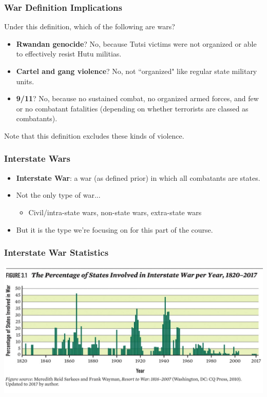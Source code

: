 \documentclass{beamer}
\begin{document}
\begin{frame} 
	\frametitle{\LARGE{War Definition Implications}}
	Under this definition, which of the following are wars? \pause
	\begin{itemize}
		\item \textbf{Rwandan genocide}? \pause No, because Tutsi victims were not organized or able to effectively resist Hutu militias. \pause
		\item \textbf{Cartel and gang violence}? \pause No, not ``organized" like regular state military units. \pause
		\item \textbf{9/11}? \pause No, because no sustained combat, no organized armed forces, and few or no combatant fatalities (depending on whether terrorists are classed as combatants). \pause	
	\end{itemize}
	Note that this definition excludes these kinds of violence.
\end{frame}

\begin{frame} 
	\frametitle{\LARGE{Interstate Wars}}
	\begin{itemize}
		\item \textbf{Interstate War}: a war (as defined prior)	in which all combatants are states. \pause
		\item Not the only type of war...
		\begin{itemize}
			\item Civil/intra-state wars, non-state wars, extra-state wars \pause
		\end{itemize}
		\item But it is the type we're focusing on for this part of the course.
	\end{itemize}
\end{frame}

\begin{frame} 
	\frametitle{\LARGE{Interstate War Statistics}}	
	\centering
	\includegraphics[width=\textwidth,height=0.9\textheight,keepaspectratio]{percentinterstatewar.jpg}
\end{frame}
\end{document}
